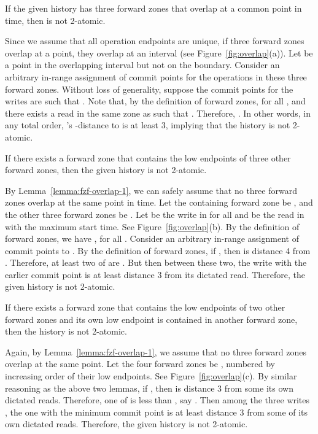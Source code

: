 {\begin{lemma}
  \label{lemma:fzf-overlap-1}
  If the given history  has three forward zones that overlap at a
  common point in time, then  is not 2-atomic.
\end{lemma}

\proof Since we assume that all operation endpoints are unique, if
three forward zones overlap at a point, they overlap at an interval
(see Figure~\ref{fig:overlap}(a)).  Let  be a point in the
overlapping interval but not on the boundary.  Consider an arbitrary
in-range assignment of commit points for the operations in these three
forward zones.  Without loss of generality, suppose the commit points
for the writes are such that .  Note that, by
the definition of forward zones,  for all ,
and there exists a read  in the same zone as  such that .  Therefore, .
In other words, in any total order, 's -distance to 
is at least 3, implying that the history is not 2-atomic.  \QED

\begin{lemma}
  \label{lemma:fzf-overlap-2}
  If there exists a forward zone that contains the low endpoints of
  three other forward zones, then the given history is not 2-atomic.
\end{lemma}

\proof By Lemma~\ref{lemma:fzf-overlap-1}, we can safely assume that
no three forward zones overlap at the same point in time.  Let the
containing forward zone be , and the other three forward zones
be .  Let  be the write in  for all  and
 be the read in  with the maximum start time.  See
Figure~\ref{fig:overlap}(b).  By the definition of forward zones, we
have , for all .  Consider an arbitrary
in-range assignment of commit points to .  By the
definition of forward zones, if , then  is
distance 4 from .  Therefore, at least two of  are
.  But then between these two, the write with the earlier
commit point is at least distance 3 from its dictated read.
Therefore, the given history is not 2-atomic.  \QED

\begin{lemma}
  \label{lemma:fzf-overlap-3}
  If there exists a forward zone that contains the low endpoints of
  two other forward zones and its own low endpoint is contained in
  another forward zone, then the history is not 2-atomic.
\end{lemma}

\proof Again, by Lemma~\ref{lemma:fzf-overlap-1}, we assume that no
three forward zones overlap at the same point.  Let the four forward
zones be , numbered by increasing order of their low
endpoints.  See Figure~\ref{fig:overlap}(c).  By similar reasoning
as the above two lemmas, if , then  is
distance 3 from some its own dictated reads.  Therefore, one of
 is less than , say .  Then among the three
writes , the one with the minimum commit point is at least
distance 3 from some of its own dictated reads.  Therefore, the given
history is not 2-atomic.  \QED

}
